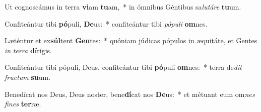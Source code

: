 \item Ut cognoscámus in terra \textbf{vi}am \textbf{tu}am,~* in ómnibus Géntibus sa\textit{lu}\textit{tá}\textit{re} \textbf{tu}um.
\item Confiteántur tibi \textbf{pó}puli, \textbf{De}us:~* confiteántur tibi \textit{pó}\textit{pu}\textit{li} \textbf{om}nes.
\item Læténtur et ex\textbf{súl}tent \textbf{Gen}tes:~* quóniam júdicas pópulos in æquitáte, et Gentes \textit{in} \textit{ter}\textit{ra} \textbf{dí}rigis.
\item Confiteántur tibi pópuli, Deus, confiteántur tibi \textbf{pó}puli \textbf{om}nes:~* terra de\textit{dit} \textit{fruc}\textit{tum} \textbf{su}um.
\item Benedícat nos Deus, Deus noster, bene\textbf{dí}cat nos \textbf{De}us:~* et métuant eum om\textit{nes} \textit{fi}\textit{nes} \textbf{ter}ræ.
